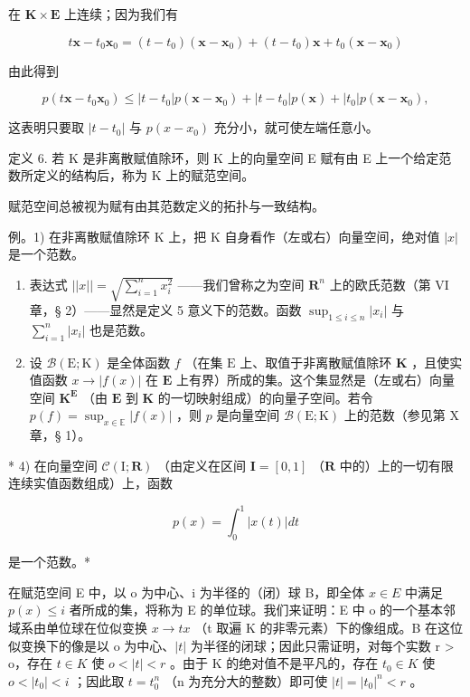 在 \(\mathbf{K} \times \mathbf{E}\) 上连续；因为我们有

\[
t \boldsymbol {x} - t _ {0} \boldsymbol {x} _ {0} = (t - t _ {0}) (\boldsymbol {x} - \boldsymbol {x} _ {0}) + (t - t _ {0}) \boldsymbol {x} + t _ {0} (\boldsymbol {x} - \boldsymbol {x} _ {0})
\]

由此得到

\[
p (t \boldsymbol {x} - t _ {0} \boldsymbol {x} _ {0}) \leqslant | t - t _ {0} | p (\boldsymbol {x} - \boldsymbol {x} _ {0}) + | t - t _ {0} | p (\boldsymbol {x}) + | t _ {0} | p (\boldsymbol {x} - \boldsymbol {x} _ {0}),
\]

这表明只要取 \(|t - t_{0}|\) 与 \(p(x - x_{0})\) 充分小，就可使左端任意小。

定义 6. 若 K 是非离散赋值除环，则 K 上的向量空间 E 赋有由 E 上一个给定范数所定义的结构后，称为 K 上的赋范空间。

赋范空间总被视为赋有由其范数定义的拓扑与一致结构。

例。1) 在非离散赋值除环 K 上，把 K 自身看作（左或右）向量空间，绝对值 \(|x|\) 是一个范数。

\begin{enumerate}
\def\labelenumi{\arabic{enumi})}
\setcounter{enumi}{1}
\item
  表达式 \(||x|| = \sqrt{\sum_{i=1}^{n} x_i^2}\) ——我们曾称之为空间 \(\mathbf{R}^n\) 上的欧氏范数（第 VI 章，§ 2）——显然是定义 5 意义下的范数。函数 \(\sup_{1 \leqslant i \leqslant n} |x_i|\) 与 \(\sum_{i=1}^{n} |x_i|\) 也是范数。
\item
  设 \(\mathcal{B}(\mathrm{E};\mathrm{K})\) 是全体函数 \(f\) （在集 \(\mathrm{E}\) 上、取值于非离散赋值除环 \(\mathbf{K}\) ，且使实值函数 \(x\to |f(x)|\) 在 \(\mathbf{E}\) 上有界）所成的集。这个集显然是（左或右）向量空间 \(\mathbf{K}^{\mathbf{E}}\) （由 \(\mathbf{E}\) 到 \(\mathbf{K}\) 的一切映射组成）的向量子空间。若令 \(p(f)=\sup_{x\in\mathbb{E}}|f(x)|\) ，则 \(p\) 是向量空间 \(\mathcal{B}(\mathrm{E};\mathrm{K})\) 上的范数（参见第 X 章，§ 1）。
\end{enumerate}

* 4) 在向量空间 \(\mathcal{C}(\mathrm{I};\mathbf{R})\) （由定义在区间 \(\mathbf{I} = [0,1]\) （\(\mathbf{R}\) 中的）上的一切有限连续实值函数组成）上，函数

\[
p (x) = \int_ {0} ^ {1} | x (t) | d t
\]

是一个范数。*

在赋范空间 E 中，以 o 为中心、i 为半径的（闭）球 B，即全体 \(x \in E\) 中满足 \(p(x) \leqslant i\) 者所成的集，将称为 E 的单位球。我们来证明：E 中 o 的一个基本邻域系由单位球在位似变换 \(x \to tx\) （t 取遍 K 的非零元素）下的像组成。B 在这位似变换下的像是以 o 为中心、\(|t|\) 为半径的闭球；因此只需证明，对每个实数 r \textgreater{} o，存在 \(t \in K\) 使 \(o < |t| < r\) 。由于 K 的绝对值不是平凡的，存在 \(t_{0} \in K\) 使 \(o < |t_{0}| < i\) ；因此取 \(t = t_{0}^{n}\) （n 为充分大的整数）即可使 \(|t| = |t_{0}|^{n} < r\) 。

